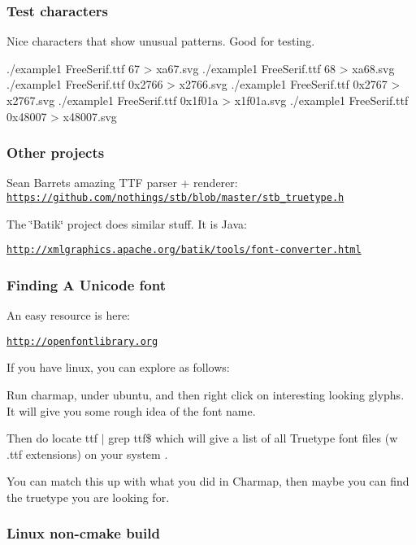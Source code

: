 \subsubsection*{Test characters}

Nice characters that show unusual patterns. Good for testing. \begin{DoxyVerb}./example1 FreeSerif.ttf 67 > xa67.svg
./example1 FreeSerif.ttf 68 > xa68.svg
./example1 FreeSerif.ttf 0x2766 > x2766.svg
./example1 FreeSerif.ttf 0x2767 > x2767.svg
./example1 FreeSerif.ttf 0x1f01a > x1f01a.svg
./example1 FreeSerif.ttf 0x48007 > x48007.svg
\end{DoxyVerb}


\subsubsection*{Other projects}

Sean Barret\textquotesingle{}s amazing T\+TF parser + renderer\+: \href{https://github.com/nothings/stb/blob/master/stb_truetype.h}{\tt https\+://github.\+com/nothings/stb/blob/master/stb\+\_\+truetype.\+h}

The \char`\"{}\+Batik\char`\"{} project does similar stuff. It is Java\+:

\href{http://xmlgraphics.apache.org/batik/tools/font-converter.html}{\tt http\+://xmlgraphics.\+apache.\+org/batik/tools/font-\/converter.\+html}

\subsubsection*{Finding A Unicode font}

An easy resource is here\+:

\href{http://openfontlibrary.org}{\tt http\+://openfontlibrary.\+org}

If you have linux, you can explore as follows\+:

Run \textquotesingle{}charmap\textquotesingle{}, under ubuntu, and then right click on interesting looking glyphs. It will give you some rough idea of the font name.

Then do \textquotesingle{}locate ttf $\vert$ grep ttf\$\textquotesingle{} which will give a list of all Truetype font files (w .ttf extensions) on your system .

You can match this up with what you did in Charmap, then maybe you can find the truetype you are looking for.

\subsubsection*{Linux non-\/cmake build}

